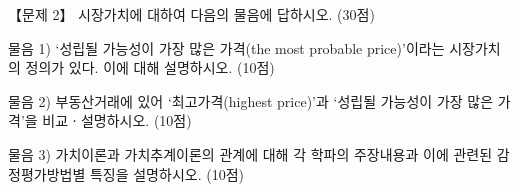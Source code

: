 \begin{longquestion}{【문제 2】}
시장가치에 대하여 다음의 물음에 답하시오. (30점) \par
\medskip\noindent 물음 1) ‘성립될 가능성이 가장 많은 가격(the most probable price)’이라는 시장가치의 정의가 있다. 이에 대해 설명하시오. (10점) \par
\medskip\noindent 물음 2) 부동산거래에 있어 ‘최고가격(highest price)’과 ‘성립될 가능성이 가장 많은 가격’을 비교ㆍ설명하시오. (10점) \par
\medskip\noindent 물음 3) 가치이론과 가치추계이론의 관계에 대해 각 학파의 주장내용과 이에 관련된 감정평가방법별 특징을 설명하시오. (10점) \par
\end{longquestion}
